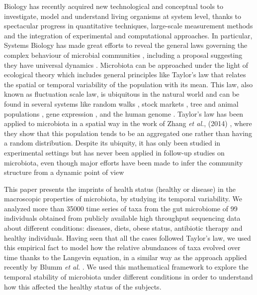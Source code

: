 Biology has recently acquired new technological and conceptual tools to investigate, model and understand living organisms at system level, thanks to spectacular progress in quantitative techniques, large-scale measurement methods and the integration of experimental and computational approaches. In particular, Systems Biology has made great efforts to reveal the general laws governing the complex behaviour of microbial communities \cite{sysbio&microb, msys1, metasysbio}, including a proposal suggesting they have universal dynamics \cite{uni_dynam}. Microbiota can be approached under the light of ecological theory which includes general principles like Taylor's law \cite{taylor} that relates the spatial or temporal variability of the population with its mean. This law, also known as fluctuation scale law, is ubiquitous in the natural world and can be found in several systems like random walks \cite{randomwalks}, stock markets \cite{economics1, economics2}, tree \cite{cohen_taylor} and animal populations \cite{taylor, animal1, animal2}, gene expression \cite{genexpress}, and the human genome \cite{genome}. Taylor's law has been applied to microbiota in a spatial way in the work of Zhang {\it et al.}, (2014) \cite{isme1}, where they show that this population tends to be an aggregated one rather than having a random distribution. Despite its ubiquity, it has only been studied in experimental settings \cite{cohen_bac, ramslayer} but has never been applied in follow-up studies on microbiota, even though major efforts have been made to infer the community structure from a dynamic point of view \cite{cobas, schloss, ravel}  

This paper presents the imprints of health status (healthy or disease) in the macroscopic properties of microbiota, by studying its temporal variability. We analyzed more than 35000 time series of taxa from the gut microbiome of 99 individuals obtained from publicly available high throughput sequencing data about different conditions: diseases, diets, obese status, antibiotic therapy and healthy individuals. Having seen that all the cases followed Taylor's law, we used this empirical fact to model how the relative abundances of taxa evolved over time thanks to the Langevin equation, in a similar way as the approach applied recently by Blumm {\it et al.} \cite{ranking}. We used this mathematical framework to explore the temporal stability of microbiota under different conditions in order to understand how this affected the healthy status of the subjects.